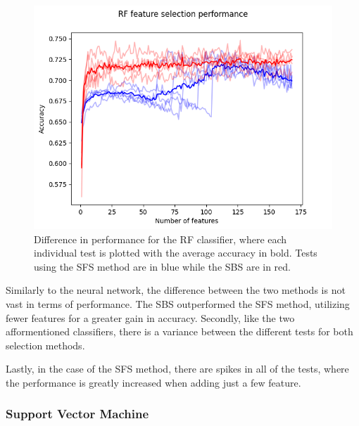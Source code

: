 \documentclass{kththesis}
\begin{document}
\begin{figure}[h!]
  \begin{center}
    \includegraphics[scale=0.8]{../new_plots/rf_graph.png}
    \caption{Difference in performance for the RF classifier, where each individual test is plotted with the average accuracy in bold. Tests using the SFS method are in blue while the SBS are in red.}
  \end{center}
\end{figure}

Similarly to the neural network, the difference between the two methods is not vast in terms of performance. The SBS outperformed the SFS method, utilizing fewer features for a greater gain in accuracy. Secondly, like the two afformentioned classifiers, there is a variance between the different tests for both selection methods.

Lastly, in the case of the SFS method, there are spikes in all of the tests, where the performance is greatly increased when adding just a few feature. 

\newpage

\subsubsection{Support Vector Machine}
\end{document}
